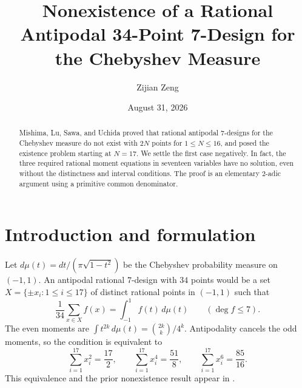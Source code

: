 \documentclass[11pt]{amsart}
\title{Nonexistence of a Rational Antipodal 34-Point 7-Design for the Chebyshev Measure}
\author{Zijian Zeng}
\date{August 31, 2026}
\theoremstyle{remark}\newtheorem{remark}[theorem]{Remark}
\begin{document}
\begin{abstract}
Mishima, Lu, Sawa, and Uchida proved that rational antipodal $7$-designs
for the Chebyshev measure do not exist with $2N$ points for
$1\leq N\leq16$, and posed the existence problem starting at $N=17$.
We settle the first case negatively. In fact, the three required rational
moment equations in seventeen variables have no solution, even without the
distinctness and interval conditions. The proof is an elementary $2$-adic
argument using a primitive common denominator.
\end{abstract}
\maketitle
\section{Introduction and formulation}
Let $d\mu(t)=dt/(\pi\sqrt{1-t^2})$ be the Chebyshev probability measure on
$(-1,1)$. An antipodal rational $7$-design with $34$ points would be a set
$X=\{\pm x_i:1\leq i\leq17\}$ of distinct rational points in $(-1,1)$
such that
\[
 \frac1{34}\sum_{x\in X}f(x)=\int_{-1}^{1}f(t)\,d\mu(t)
 \qquad (\deg f\leq7).
\]
The even moments are $\int t^{2k}\,d\mu(t)=\binom{2k}{k}/4^k$.
Antipodality cancels the odd moments, so the condition is equivalent to
\begin{equation}\label{eq:moments}
 \sum_{i=1}^{17}x_i^2=\frac{17}{2},\qquad
 \sum_{i=1}^{17}x_i^4=\frac{51}{8},\qquad
 \sum_{i=1}^{17}x_i^6=\frac{85}{16}.
\end{equation}
This equivalence and the prior nonexistence result appear in
\cite[Section~8, preceding Theorem~8.4; Theorem~8.4 and Problem~8.5]{Mishima2026}.
\end{document}
